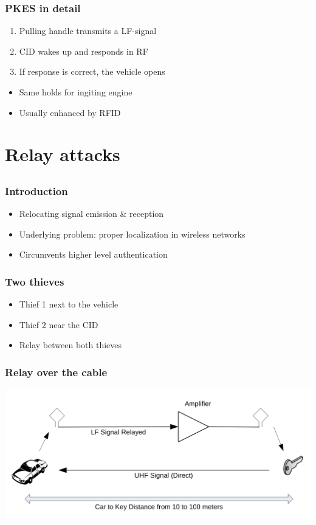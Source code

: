 \documentclass[12pt]{beamer}
\begin{document}
	\begin{frame}
		\frametitle{PKES in detail}
		\begin{enumerate}
			\item Pulling handle transmits a LF-signal
			\item CID wakes up and responds in RF
			\item If response is correct, the vehicle opens
		\end{enumerate}
		\begin{itemize}
			\item Same holds for ingiting engine
			\item Usually enhanced by RFID
		\end{itemize}
	\end{frame}

\section{Relay attacks}
\subsection*{}
	\begin{frame}
	\frametitle{Introduction}
		\begin{itemize}
			\item Relocating signal emission \& reception
			\item Underlying problem: proper localization in wireless networks
			\item Circumvents higher level authentication
		\end{itemize}
	\end{frame}

	\begin{frame}
		\frametitle{Two thieves}
		\begin{itemize}
			\item Thief 1 next to the vehicle
			\item Thief 2 near the CID
			\item Relay between both thieves
		\end{itemize}
	\end{frame}
	
	\begin{frame}
	\frametitle{Relay over the cable}
		\begin{center}
			\includegraphics[scale=0.85]{img/franc_relay_over_the_wire.png} 
		\end{center}
	\end{frame}
	
\end{document}
